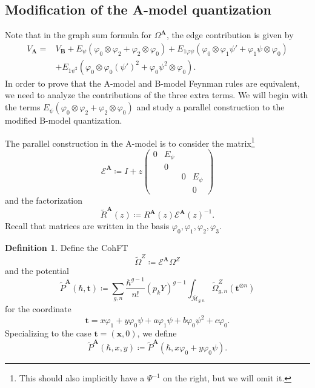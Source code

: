 \documentclass[10pt]{amsart}
\theoremstyle{definition}
\newtheorem{defn}[thm]{Definition}
\theoremstyle{remark}
\theoremstyle{plain}
\theoremstyle{definition}
\theoremstyle{remark}
\newcommand{\bA}{\mathbf{A}}
\newcommand{\bB}{\mathbf{B}}
\newcommand{\bx}{\mathbf{x}}
\newcommand{\bt}{\mathbf{t}}
\newcommand{\msc}[1]{\mathscr{#1}}
\newcommand{\ol}[1]{\overline{#1}}
\newcommand{\1}{\mathbf{1}}
\newcommand{\2}{\mathbf{2}}
\newcommand{\3}{\mathbf{3}}
\numberwithin{equation}{section}
\begin{document}
\subsection{Modification of the A-model quantization}%
\label{sub:Modification of the A-model quantization}

Note that in the graph sum formula for $\Omega^{\bA}$, the edge contribution is given by
\begin{align*}
    V_{\bA} 
    ={}& V_{\bB} 
    + E_{\psi} (\varphi_0 \otimes \varphi_2 + \varphi_2 \otimes \varphi_0) + E_{1\varphi\psi} (\varphi_0 \otimes \varphi_1 \psi' + \varphi_1 \psi \otimes \varphi_0) \\ 
    &+ E_{1\psi^2} (\varphi_0 \otimes \varphi_0 (\psi')^2 + \varphi_0 \psi^2 \otimes \varphi_0).
\end{align*}
In order to prove that the A-model and B-model Feynman rules are equivalent, we need to analyze the contributions of the three extra terms. We will begin with the terms $E_{\psi} (\varphi_0 \otimes \varphi_2 + \varphi_2 \otimes \varphi_0)$ and study a parallel construction to the modified B-model quantization.

The parallel construction in the A-model is to consider the matrix\footnote{This should also implicitly have a $\Psi^{-1}$ on the right, but we will omit it.}
\[ \msc{E}^{\bA} \coloneqq I + z \begin{pmatrix}
    0 & E_{\psi} \\
    & 0 \\
    & & 0 & E_{\psi} \\
    & & & 0
\end{pmatrix}
\]
and the factorization
\[ \tilde{R}^{\bA}(z) \coloneqq R^{\bA}(z) \msc{E}^{\bA}(z)^{-1}. \]
Recall that matrices are written in the basis $\varphi_0, \varphi_1, \varphi_2, \varphi_3$.

\begin{defn}
    Define the CohFT
    \[ \tilde{\Omega}^Z \coloneqq \msc{E}^{\bA} \Omega^{Z} \]
    and the potential
    \[ \tilde{P}^{\bA}(\hbar, \bt) \coloneqq \sum_{g,n} \frac{\hbar^{g-1}}{n!} (p_k Y)^{g-1} \int_{\ol{\msc{M}}_{g,n}} \tilde{\Omega}^Z_{g,n}(\bt^{\otimes n}) \]
    for the coordinate
    \[ \bt = x \varphi_1 + y \varphi_0 \psi + a \varphi_1 \psi + b \varphi_0 \psi^2 + c \varphi_0. \]
    Specializing to the case $\bt = (\bx, 0)$, we define
    \[ \tilde{P}^{\bA}(\hbar, x, y) \coloneqq \tilde{P}^{\bA}(\hbar, x\varphi_0 + y \varphi_0 \psi). \]
\end{defn}
\end{document}
